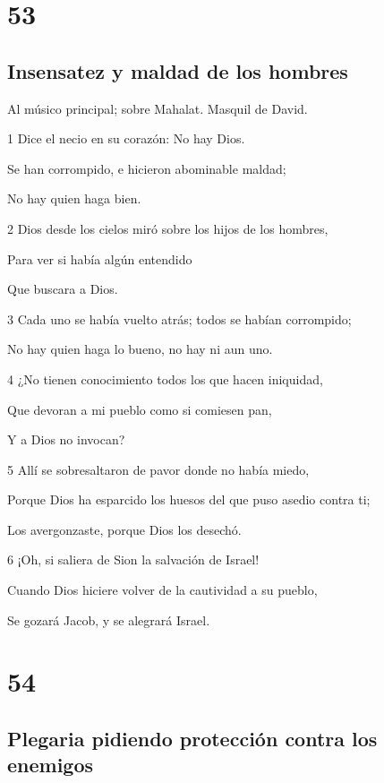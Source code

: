 \chapter{53}

\section*{Insensatez y maldad de los hombres}

\par Al músico principal; sobre Mahalat. Masquil de David.

\par 1 Dice el necio en su corazón: No hay Dios.
\par Se han corrompido, e hicieron abominable maldad;
\par No hay quien haga bien.
\par 2 Dios desde los cielos miró sobre los hijos de los hombres,
\par Para ver si había algún entendido
\par Que buscara a Dios.
\par 3 Cada uno se había vuelto atrás; todos se habían corrompido;
\par No hay quien haga lo bueno, no hay ni aun uno.
\par 4 ¿No tienen conocimiento todos los que hacen iniquidad,
\par Que devoran a mi pueblo como si comiesen pan,
\par Y a Dios no invocan?
\par 5 Allí se sobresaltaron de pavor donde no había miedo,
\par Porque Dios ha esparcido los huesos del que puso asedio contra ti;
\par Los avergonzaste, porque Dios los desechó.
\par 6 ¡Oh, si saliera de Sion la salvación de Israel!
\par Cuando Dios hiciere volver de la cautividad a su pueblo,
\par Se gozará Jacob, y se alegrará Israel.

\chapter{54}

\section*{Plegaria pidiendo protección contra los enemigos}

